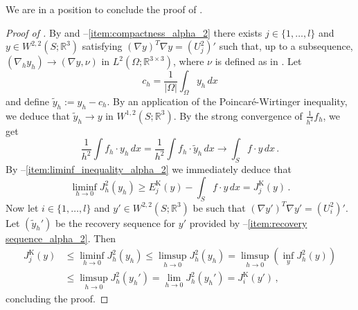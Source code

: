 \documentclass{article}
\theoremstyle{plain}
\theoremstyle{plain}
\theoremstyle{plain}
\theoremstyle{plain}
\theoremstyle{plain}
\theoremstyle{definition}
\theoremstyle{definition}
\renewcommand{\r}{\mathbb{R}}
\DeclareMathOperator{\KL}{K}
\begin{document}
We are in a position to conclude the proof of .

\begin{proof}[Proof of ]
	By  and --\ref{item:compactness_alpha_2} there exists $j \in \{1, \dots, l\}$ and $y \in W^{2, 2}(S; \r^3)$ satisfying $(\nabla y)^T \nabla y = (U_j^2)'$ such that, up to a subsequence, $(\nabla_h y_h) \to (\nabla y, \nu)$ in $L^2(\Omega; \r^{3 \times 3})$, where $\nu$ is defined as in . Let
	\[
		c_h = \dfrac{1}{|\Omega|}\int_\Omega y_h \, dx
	\]
	and define $\tilde y_h := y_h - c_h$. By an application of the Poincaré-Wirtinger inequality, we deduce that $\tilde y_h \to y$ in $W^{1, 2}(S; \r^3)$. By the strong convergence of $\frac{1}{h^2}f_h$, we get
	\begin{equation}\label{eq:strong_convergence_force_term}
		\dfrac{1}{h^2} \int f_h \cdot y_h \, dx = \dfrac{1}{h^2} \int f_h \cdot \tilde y_h \, dx \to \int_S f \cdot y \, dx \,.
	\end{equation}
	By --\ref{item:liminf_inequality_alpha_2} we immediately deduce that
	\begin{equation}\label{eq:liminf_total_energy}
		\liminf_{h \to 0} J^2_h(y_h) \geq E^{\KL}_j(y) - \int_S f \cdot y \, dx = J_j^{\KL}(y)\,.
	\end{equation}
	Now let $i \in \{1, \dots, l\}$ and $y' \in W^{2, 2}(S; \r^3)$ be such that $(\nabla y')^T \nabla y' = (U_i^2)'$. Let $(\tilde y_h')$ be the recovery sequence for $y'$ provided by --\ref{item:recovery sequence_alpha_2}. Then 
	\begin{align}
		J_j^{\KL}(y) & \leq \liminf_{h \to 0} J_h^2(y_h) \leq \limsup_{h \to 0} J_h^2(y_h) = \limsup_{h \to 0} (\inf_y J_h^2(y))\\
		& \leq \limsup_{h \to 0} J_h^2(y_h') = \lim_{h \to 0} J_h^2(y_h') = J_i^{\KL}(y') \,,
	\end{align}
	concluding the proof.
\end{proof}
\end{document}
